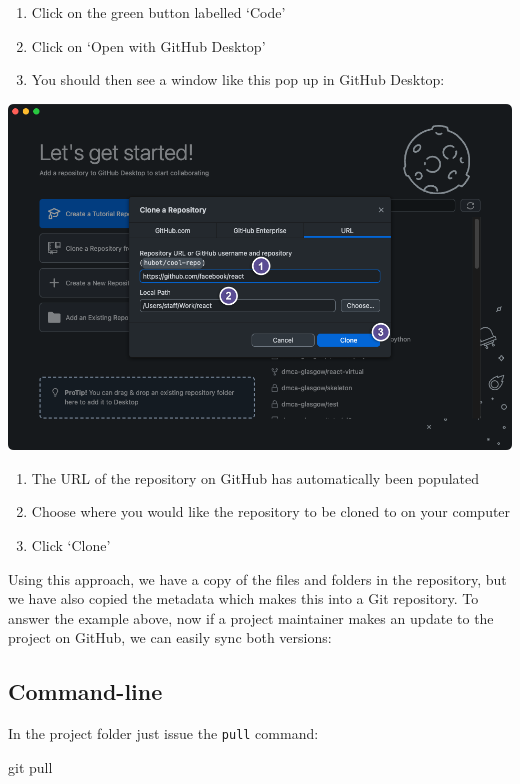 \documentclass[
  letterpaper,
  DIV=11,
  numbers=noendperiod]{scrartcl}
\newenvironment{Shaded}{\begin{snugshade}}{\end{snugshade}}
\newcommand{\FunctionTok}[1]{\textcolor[rgb]{0.28,0.35,0.67}{#1}}
\newcommand{\NormalTok}[1]{\textcolor[rgb]{0.00,0.23,0.31}{#1}}
\begin{document}
\begin{enumerate}
\def\labelenumi{\arabic{enumi}.}
\item
  Click on the green button labelled `Code'
\item
  Click on `Open with GitHub Desktop'
\item
  You should then see a window like this pop up in GitHub Desktop:
\end{enumerate}

\includegraphics{images/image25.png}

\begin{enumerate}
\def\labelenumi{\arabic{enumi}.}
\item
  The URL of the repository on GitHub has automatically been populated
\item
  Choose where you would like the repository to be cloned to on your
  computer
\item
  Click `Clone'
\end{enumerate}

Using this approach, we have a copy of the files and folders in the
repository, but we have also copied the metadata which makes this into a
Git repository. To answer the example above, now if a project maintainer
makes an update to the project on GitHub, we can easily sync both
versions:

\subsection{Command-line}

In the project folder just issue the \texttt{pull} command:

\begin{Shaded}
\begin{Highlighting}[]
\FunctionTok{git}\NormalTok{ pull}
\end{Highlighting}
\end{Shaded}
\end{document}
